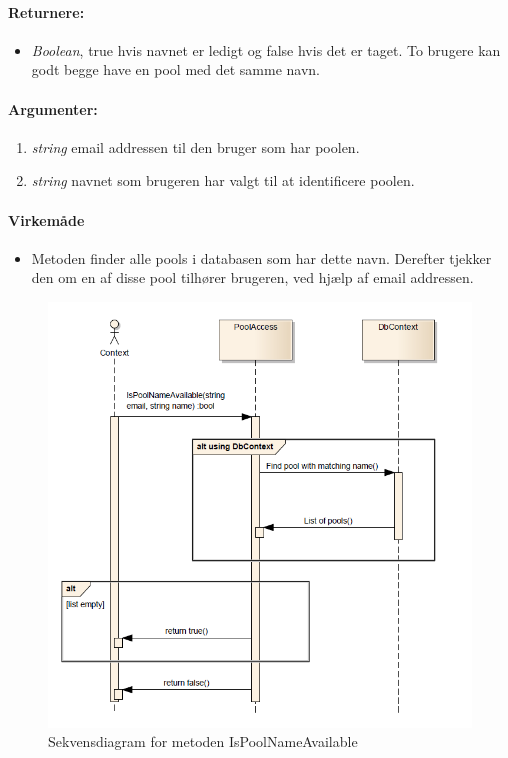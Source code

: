 \paragraph{Returnere:}
\begin{itemize}
	\item \textit{Boolean}, true hvis navnet er ledigt og false hvis det er taget. To brugere kan godt begge have en pool med det samme navn.
\end{itemize}

\paragraph{Argumenter:}
\begin{enumerate}
	\item \textit{string} email addressen til den bruger som har poolen.
	\item \textit{string} navnet som brugeren har valgt til at identificere poolen.
\end{enumerate}

\paragraph{Virkemåde}
\begin{itemize}
	\item Metoden finder alle pools i databasen som har dette navn. Derefter tjekker den om en af disse pool tilhører brugeren, ved hjælp af email addressen.
\end{itemize}

\begin{figure}
\centering
\includegraphics[width=0.7\linewidth]{figs/dbSeq/isPoolNameAvailable}
\caption{Sekvensdiagram for metoden IsPoolNameAvailable}
\label{fig:isPoolNameAvailable}
\end{figure}






